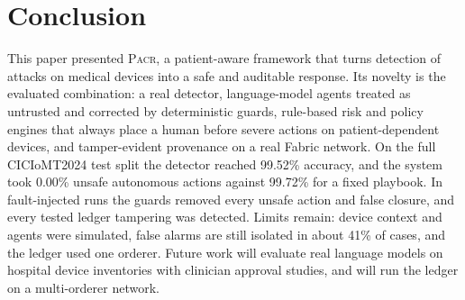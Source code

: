 \documentclass[preprint,12pt]{elsarticle}
\newcommand{\pacr}{\textsc{Pacr}}
\begin{document}
\section{Conclusion}
\label{sec:conclusion}
This paper presented \pacr, a patient-aware framework that turns detection of attacks on medical devices into a safe and auditable response. Its novelty is the evaluated combination: a real detector, language-model agents treated as untrusted and corrected by deterministic guards, rule-based risk and policy engines that always place a human before severe actions on patient-dependent devices, and tamper-evident provenance on a real Fabric network. On the full CICIoMT2024 test split the detector reached 99.52\% accuracy, and the system took 0.00\% unsafe autonomous actions against 99.72\% for a fixed playbook. In fault-injected runs the guards removed every unsafe action and false closure, and every tested ledger tampering was detected. Limits remain: device context and agents were simulated, false alarms are still isolated in about 41\% of cases, and the ledger used one orderer. Future work will evaluate real language models on hospital device inventories with clinician approval studies, and will run the ledger on a multi-orderer network.
\end{document}
